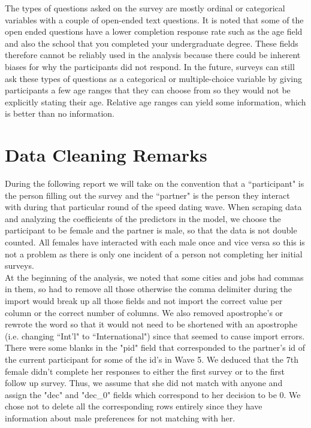 \documentclass{article}
\begin{document}
The types of questions asked on the survey are mostly ordinal or categorical variables with a couple of open-ended text questions.  It is noted that some of the open ended questions have a lower completion response rate such as the age field and also the school that you completed your undergraduate degree.  These fields therefore cannot be reliably used in the analysis because there could be inherent biases for why the participants did not respond. In the future, surveys can still ask these types of questions as a categorical or multiple-choice variable by giving participants a few age ranges that they can choose from so they would not be explicitly stating their age.  Relative age ranges can yield some information, which is better than no information.\\


\section{Data Cleaning Remarks}
During the following report we will take on the convention that a ``participant" is the person filling out the survey and the ``partner" is the person they interact with during that particular round of the speed dating wave.  When scraping data and analyzing the coefficients of the predictors in the model, we choose the participant to be female and the partner is male, so that the data is not double counted.  All females have interacted with each male once and vice versa so this is not a problem as there is only one incident of a person not completing her initial surveys.\\

At the beginning of the analysis, we noted that some cities and jobs had commas in them, so had to remove all those otherwise the comma delimiter during the import would break up all those fields and not import the correct value per column or the correct number of columns.  We also removed apostrophe's  or rewrote the word so that it would not need to be shortened with an apostrophe (i.e. changing ``Int'l" to ``International") since that seemed to cause import errors.\\

There were some blanks in the "pid" field that corresponded to the partner's id of the current participant for some of the id's in Wave 5. We deduced that the 7th female  didn't complete her responses to either the first survey or to the first follow up survey. Thus, we assume that she did not match with anyone and assign the "dec" and "dec\_0" fields which correspond to her decision to be 0. We chose not to delete all the corresponding rows entirely since they have information about male preferences for not matching with her.\\
\end{document}
